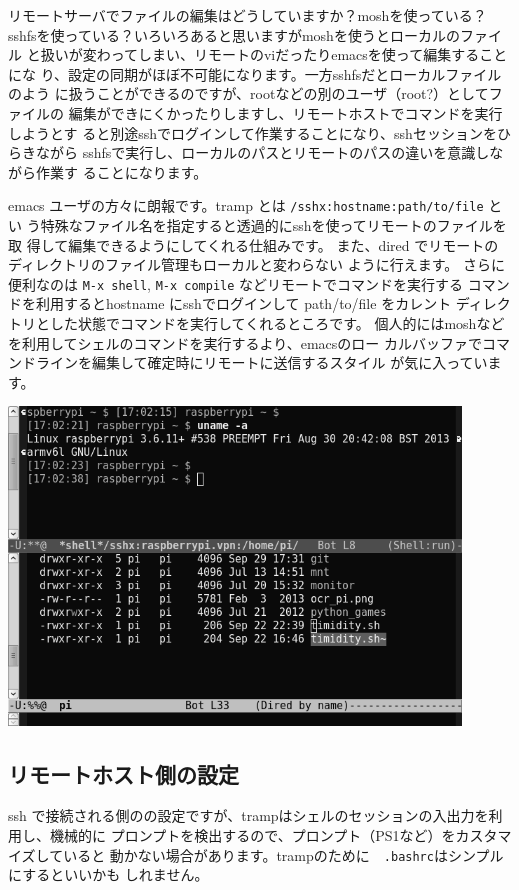 \documentclass[mingoth,a4paper]{jsarticle}
\begin{document}
リモートサーバでファイルの編集はどうしていますか？moshを使っている？
sshfsを使っている？いろいろあると思いますがmoshを使うとローカルのファイル
と扱いが変わってしまい、リモートのviだったりemacsを使って編集することにな
り、設定の同期がほぼ不可能になります。一方sshfsだとローカルファイルのよう
に扱うことができるのですが、rootなどの別のユーザ（root?）としてファイルの
編集ができにくかったりしますし、リモートホストでコマンドを実行しようとす
ると別途sshでログインして作業することになり、sshセッションをひらきながら
sshfsで実行し、ローカルのパスとリモートのパスの違いを意識しながら作業す
ることになります。

emacs ユーザの方々に朗報です。tramp とは \texttt{/sshx:hostname:path/to/file} とい
う特殊なファイル名を指定すると透過的にsshを使ってリモートのファイルを取
得して編集できるようにしてくれる仕組みです。
また、dired でリモートのディレクトリのファイル管理もローカルと変わらない
ように行えます。
さらに便利なのは \texttt{M-x shell}, \texttt{M-x compile} などリモートでコマンドを実行する
コマンドを利用するとhostname にsshでログインして path/to/file をカレント
ディレクトリとした状態でコマンドを実行してくれるところです。
個人的にはmoshなどを利用してシェルのコマンドを実行するより、emacsのロー
カルバッファでコマンドラインを編集して確定時にリモートに送信するスタイル
が気に入っています。

\includegraphics[width=12cm]{image201311/tramp-screenshot_mono.png}


\subsection{リモートホスト側の設定}
ssh で接続される側のの設定ですが、trampはシェルのセッションの入出力を利用し、機械的に
プロンプトを検出するので、プロンプト（PS1など）をカスタマイズしていると
動かない場合があります。trampのために　\texttt{.bashrc}はシンプルにするといいかも
しれません。
\end{document}
